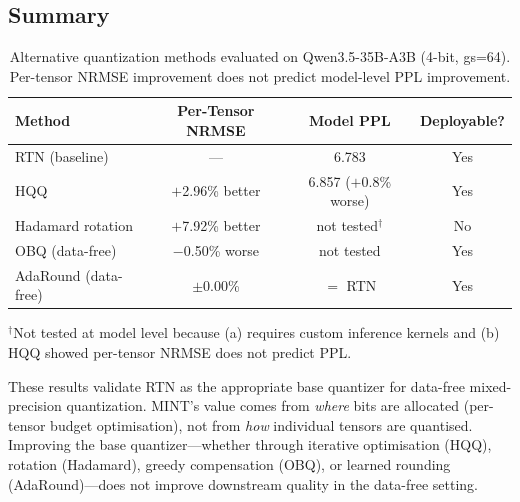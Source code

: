 \documentclass{article}
\begin{document}
\subsection{Summary}

\begin{table}[h]
\centering
\caption{Alternative quantization methods evaluated on Qwen3.5-35B-A3B (4-bit, gs=64). Per-tensor NRMSE improvement does not predict model-level PPL improvement.}
\label{tab:alt_methods}
\begin{tabular}{lccc}
\toprule
\textbf{Method} & \textbf{Per-Tensor NRMSE} & \textbf{Model PPL} & \textbf{Deployable?} \\
\midrule
RTN (baseline) & --- & 6.783 & Yes \\
HQQ & $+$2.96\% better & 6.857 ($+$0.8\% worse) & Yes \\
Hadamard rotation & $+$7.92\% better & not tested$^\dagger$ & No \\
OBQ (data-free) & $-$0.50\% worse & not tested & Yes \\
AdaRound (data-free) & $\pm$0.00\% & $=$ RTN & Yes \\
\bottomrule
\end{tabular}

\vspace{0.5em}
{\small $^\dagger$Not tested at model level because (a) requires custom inference kernels and (b) HQQ showed per-tensor NRMSE does not predict PPL.}
\end{table}

These results validate RTN as the appropriate base quantizer for data-free mixed-precision quantization. MINT's value comes from \emph{where} bits are allocated (per-tensor budget optimisation), not from \emph{how} individual tensors are quantised. Improving the base quantizer---whether through iterative optimisation (HQQ), rotation (Hadamard), greedy compensation (OBQ), or learned rounding (AdaRound)---does not improve downstream quality in the data-free setting.
\end{document}
